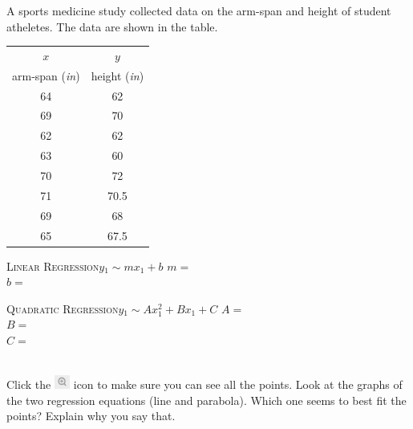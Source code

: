 \documentclass[12pt,letterpaper]{memoir}
\begin{document}
\myWideProblemWithContent 
{
    A sports medicine study collected data on the 
    arm-span and height of student atheletes.
    The data are shown in the table.\\[0.5em]
    \begin{minipage}{0.35\textwidth}
        \footnotesize
        \begin{tabular}{cc}
            $x$ & $y$ \\ 
            arm-span ({\itshape in}) & height ({\itshape in}) \\
            \midrule 
            64 & 62 \\
            69 & 70 \\ 
            62 & 62 \\ 
            63 & 60 \\ 
            70 & 72 \\ 
            71 & 70.5 \\ 
            69 & 68 \\ 
            65 & 67.5 \\ 
            \bottomrule
        \end{tabular}
        \end{minipage}
    \begin{minipage}{0.64\textwidth}
        \begin{tcolorbox}[colback=white,width=\textwidth]
            \small
            \scshape{Linear Regression}\hfill$y_1 \sim m x_1 + b$
            \tcblower
            $m =$  \\
            $b =$ 
        \end{tcolorbox}
        \begin{tcolorbox}[colback=white,width=\textwidth]
            \small
            \scshape{Quadratic Regression}\hfill$y_1 \sim A x_1^2 + B x_1 + C$
            \tcblower
            $A =$  \\
            $B =$ \\
            $C =$ 
        \end{tcolorbox}
    \end{minipage}\\[1\onelineskip]
    Click the 
    \includegraphics[width=0.2in]{magnifying-glass-plus.png} 
    icon to make sure you can see all the points.
    Look at the graphs of the two regression equations 
    (line and parabola).
    Which one seems to best fit the points?
    Explain why you say that.
    \vspace{0.7in}
}
\end{document}
